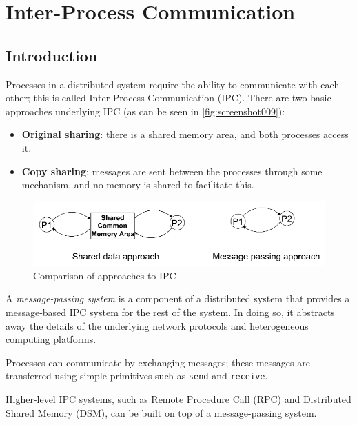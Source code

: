 \chapter{Inter-Process Communication}
\section{Introduction}
Processes in a distributed system require the ability to communicate with each other; this is called Inter-Process Communication (IPC). There are two basic approaches underlying IPC (as can be seen in \autoref{fig:screenshot009}):
\begin{itemize}
\item \textbf{Original sharing}: there is a shared memory area, and both processes access it.
\item \textbf{Copy sharing}: messages are sent between the processes through some mechanism, and no memory is shared to facilitate this.
\end{itemize}

\begin{figure}[h]
\centering
\includegraphics[width=0.7\linewidth]{screenshot009}
\caption{Comparison of approaches to IPC}
\label{fig:screenshot009}
\end{figure}

A \textit{message-passing system} is a component of a distributed system that provides a message-based IPC system for the rest of the system. In doing so, it abstracts away the details of the underlying network protocols and heterogeneous computing platforms.

Processes can communicate by exchanging messages; these messages are transferred using simple primitives such as \texttt{send} and \texttt{receive}.

Higher-level IPC systems, such as Remote Procedure Call (RPC) and Distributed Shared Memory (DSM), can be built on top of a message-passing system.

